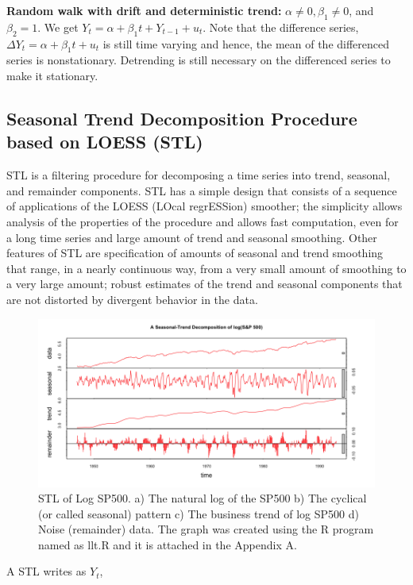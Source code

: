 \textbf{Random walk with drift and deterministic trend:} $\alpha \neq 0, \beta_1 \neq 0$, and $\beta_2=1$. We get $Y_t = \alpha + \beta_{1}t + Y_{t-1} + u_t$. Note that the difference series, $\Delta Y_t = \alpha+\beta_{1}t+u_t$ is still time varying and hence, the mean of the differenced series is nonstationary. Detrending is still necessary on the differenced series to make it stationary. 


\subsection{Seasonal Trend Decomposition Procedure based on LOESS (STL)}
STL is a filtering procedure for decomposing a time series into trend, seasonal, and remainder components. STL has a simple design that consists of a sequence of applications of the LOESS (LOcal regrESSion) smoother; the simplicity allows analysis of the properties of the procedure and allows fast computation, even for a long time series and large amount of trend and seasonal smoothing. Other features of STL are specification of amounts of seasonal and trend smoothing that range, in a nearly continuous way, from a very small amount of smoothing to a very large amount; robust estimates of the trend and seasonal components that are not distorted by divergent behavior in the data. 

\begin{figure}[!ht]
\centering
\includegraphics[scale=.5]{Images/STLSP500}
\caption{STL of Log SP500. a) The natural log of the SP500 b) The cyclical (or called seasonal) pattern c) The business trend of log SP500 d) Noise (remainder) data. The graph was created using the R program named as llt.R and it is attached in the Appendix A.}
\label{fig:STLSP500}
\end{figure}

A STL writes as $Y_t$, 

